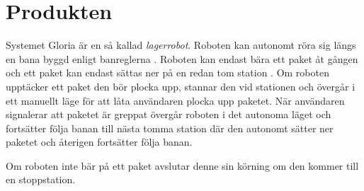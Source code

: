 
\section{Produkten}

Systemet Gloria är en så kallad \textit{lagerrobot}. Roboten kan autonomt röra sig längs en bana byggd enligt banreglerna . Roboten kan endast bära ett paket åt gången och ett paket kan endast sättas ner på en redan tom station . Om roboten upptäcker ett paket den bör plocka upp, stannar den vid stationen och övergår i ett manuellt läge för att låta användaren plocka upp paketet. När användaren signalerar att paketet är greppat övergår roboten i det autonoma läget och fortsätter följa banan till nästa tomma station där den autonomt sätter ner paketet och återigen fortsätter följa banan.

Om roboten inte bär på ett paket avslutar denne sin körning om den kommer till en stoppstation.

